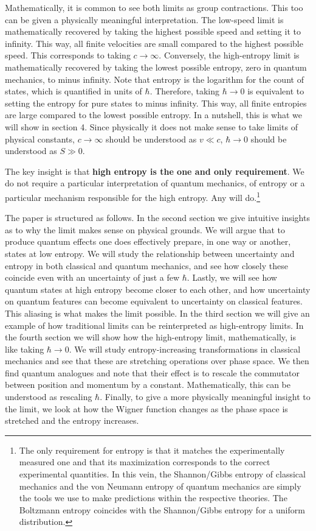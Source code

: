 \documentclass{article}
\begin{document}
Mathematically, it is common to see both limits as group contractions. This too can be given a physically meaningful interpretation. The low-speed limit is mathematically recovered by taking the highest possible speed and setting it to infinity. This way, all finite velocities are small compared to the highest possible speed. This corresponds to taking $c \to \infty$. Conversely, the high-entropy limit is mathematically recovered by taking the lowest possible entropy, zero in quantum mechanics, to minus infinity. Note that entropy is the logarithm for the count of states, which is quantified in units of $\hbar$. Therefore, taking $\hbar \to 0$ is equivalent to setting the entropy for pure states to minus infinity. This way, all finite entropies are large compared to the lowest possible entropy. In a nutshell, this is what we will show in section 4. Since physically it does not make sense to take limits of physical constants, $c \to \infty$ should be understood as $v \ll c$, $\hbar \to 0$ should be understood as $S \gg 0$.

The key insight is that \textbf{high entropy is the one and only requirement}. We do not require a particular interpretation of quantum mechanics, of entropy or a particular mechanism responsible for the high entropy. Any will do.\footnote{The only requirement for entropy is that it matches the experimentally measured one and that its maximization corresponds to the correct experimental quantities. In this vein, the Shannon/Gibbs entropy of classical mechanics and the von Neumann entropy of quantum mechanics are simply the tools we use to make predictions within the respective theories. The Boltzmann entropy coincides with the Shannon/Gibbs entropy for a uniform distribution. }

The paper is structured as follows. In the second section we give intuitive insights as to why the limit makes sense on physical grounds. We will argue that to produce quantum effects one does effectively prepare, in one way or another, states at low entropy. We will study the relationship between uncertainty and entropy in both classical and quantum mechanics, and see how closely these coincide even with an uncertainty of just a few $\hbar$. Lastly, we will see how quantum states at high entropy become closer to each other, and how uncertainty on quantum features can become equivalent to uncertainty on classical features. This aliasing is what makes the limit possible. In the third section we will give an example of how traditional limits can be reinterpreted as high-entropy limits. In the fourth section we will show how the high-entropy limit, mathematically, is like taking $\hbar \to 0$. We will study entropy-increasing transformations in classical mechanics and see that these are stretching operations over phase space. We then find quantum analogues and note that their effect is to rescale the commutator between position and momentum by a constant. Mathematically, this can be understood as rescaling $\hbar$. Finally, to give a more physically meaningful insight to the limit, we look at how the Wigner function changes as the phase space is stretched and the entropy increases.
\end{document}
